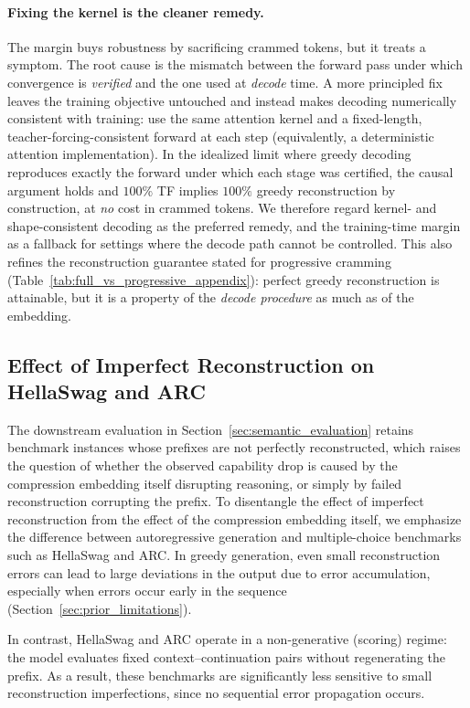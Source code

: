 \paragraph{Fixing the kernel is the cleaner remedy.}
The margin buys robustness by sacrificing crammed tokens, but it treats a symptom. The root cause is the mismatch between the forward pass under which convergence is \emph{verified} and the one used at \emph{decode} time. A more principled fix leaves the training objective untouched and instead makes decoding numerically consistent with training: use the same attention kernel and a fixed-length, teacher-forcing-consistent forward at each step (equivalently, a deterministic attention implementation). In the idealized limit where greedy decoding reproduces exactly the forward under which each stage was certified, the causal argument holds and $100\%$ TF implies $100\%$ greedy reconstruction by construction, at \emph{no} cost in crammed tokens. We therefore regard kernel- and shape-consistent decoding as the preferred remedy, and the training-time margin as a fallback for settings where the decode path cannot be controlled. This also refines the reconstruction guarantee stated for progressive cramming (Table~\ref{tab:full_vs_progressive_appendix}): perfect greedy reconstruction is attainable, but it is a property of the \emph{decode procedure} as much as of the embedding.

\subsection{Effect of Imperfect Reconstruction on HellaSwag and ARC}
\label{app:imperfect_reconstruction}

The downstream evaluation in Section~\ref{sec:semantic_evaluation} retains benchmark instances whose prefixes are not perfectly reconstructed, which raises the question of whether the observed capability drop is caused by the compression embedding itself disrupting reasoning, or simply by failed reconstruction corrupting the prefix.
To disentangle the effect of imperfect reconstruction from the effect of the compression embedding itself, we emphasize the difference between autoregressive generation and multiple-choice benchmarks such as HellaSwag and ARC. In greedy generation, even small reconstruction errors can lead to large deviations in the output due to error accumulation, especially when errors occur early in the sequence (Section~\ref{sec:prior_limitations}).

In contrast, HellaSwag and ARC operate in a non-generative (scoring) regime: the model evaluates fixed context--continuation pairs without regenerating the prefix. As a result, these benchmarks are significantly less sensitive to small reconstruction imperfections, since no sequential error propagation occurs.

